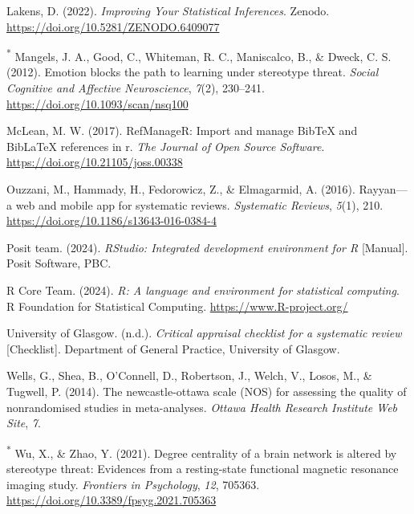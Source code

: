 \documentclass[
  stu]{apa7}
\newlength{\cslhangindent}
\newenvironment{CSLReferences}[2] %
 {\begin{list}{}{%
  \setlength{\itemindent}{0pt}
  \setlength{\leftmargin}{0pt}
  \setlength{\parsep}{0pt}
  \ifodd #1
   \setlength{\leftmargin}{\cslhangindent}
   \setlength{\itemindent}{-1\cslhangindent}
  \fi
  \setlength{\itemsep}{#2\baselineskip}}}
 {\end{list}}
\begin{document}
\begin{CSLReferences}{1}{0}
Lakens, D. (2022). \emph{Improving {Your Statistical Inferences}}. Zenodo. \url{https://doi.org/10.5281/ZENODO.6409077}

\textsuperscript{*} Mangels, J. A., Good, C., Whiteman, R. C., Maniscalco, B., \& Dweck, C. S. (2012). Emotion blocks the path to learning under stereotype threat. \emph{Social Cognitive and Affective Neuroscience}, \emph{7}(2), 230--241. \url{https://doi.org/10.1093/scan/nsq100}

McLean, M. W. (2017). RefManageR: Import and manage BibTeX and BibLaTeX references in r. \emph{The Journal of Open Source Software}. \url{https://doi.org/10.21105/joss.00338}

Ouzzani, M., Hammady, H., Fedorowicz, Z., \& Elmagarmid, A. (2016). Rayyan---a web and mobile app for systematic reviews. \emph{Systematic Reviews}, \emph{5}(1), 210. \url{https://doi.org/10.1186/s13643-016-0384-4}

Posit team. (2024). \emph{{RStudio}: {Integrated} development environment for {R}} {[}Manual{]}. Posit Software, PBC.

R Core Team. (2024). \emph{R: A language and environment for statistical computing}. R Foundation for Statistical Computing. \url{https://www.R-project.org/}

University of Glasgow. (n.d.). \emph{Critical appraisal checklist for a systematic review} {[}Checklist{]}. Department of General Practice, University of Glasgow.

Wells, G., Shea, B., O'Connell, D., Robertson, J., Welch, V., Losos, M., \& Tugwell, P. (2014). The newcastle-ottawa scale ({NOS}) for assessing the quality of nonrandomised studies in meta-analyses. \emph{Ottawa Health Research Institute Web Site}, \emph{7}.

\textsuperscript{*} Wu, X., \& Zhao, Y. (2021). Degree centrality of a brain network is altered by stereotype threat: {Evidences} from a resting-state functional magnetic resonance imaging study. \emph{Frontiers in Psychology}, \emph{12}, 705363. \url{https://doi.org/10.3389/fpsyg.2021.705363}


\end{CSLReferences}
\end{document}
